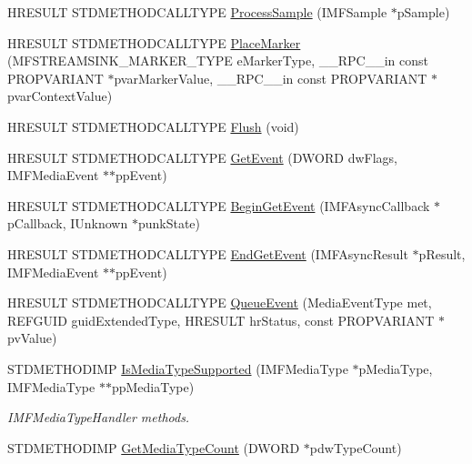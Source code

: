 \begin{DoxyCompactItemize}
\item 
H\+R\+E\+S\+U\+LT S\+T\+D\+M\+E\+T\+H\+O\+D\+C\+A\+L\+L\+T\+Y\+PE \hyperlink{class_stream_sink_a64ae241ae6b96fb3fd80edb6d02474ec}{Process\+Sample} (I\+M\+F\+Sample $\ast$p\+Sample)
\item 
H\+R\+E\+S\+U\+LT S\+T\+D\+M\+E\+T\+H\+O\+D\+C\+A\+L\+L\+T\+Y\+PE \hyperlink{class_stream_sink_ab8273c7f471918ba79d7033e132214ea}{Place\+Marker} (M\+F\+S\+T\+R\+E\+A\+M\+S\+I\+N\+K\+\_\+\+M\+A\+R\+K\+E\+R\+\_\+\+T\+Y\+PE e\+Marker\+Type, \+\_\+\+\_\+\+R\+P\+C\+\_\+\+\_\+in const P\+R\+O\+P\+V\+A\+R\+I\+A\+NT $\ast$pvar\+Marker\+Value, \+\_\+\+\_\+\+R\+P\+C\+\_\+\+\_\+in const P\+R\+O\+P\+V\+A\+R\+I\+A\+NT $\ast$pvar\+Context\+Value)
\item 
H\+R\+E\+S\+U\+LT S\+T\+D\+M\+E\+T\+H\+O\+D\+C\+A\+L\+L\+T\+Y\+PE \hyperlink{class_stream_sink_a92fca921c52cb7252f4c38c30e26c81a}{Flush} (void)
\item 
H\+R\+E\+S\+U\+LT S\+T\+D\+M\+E\+T\+H\+O\+D\+C\+A\+L\+L\+T\+Y\+PE \hyperlink{class_stream_sink_a5b5fed15133cf2cd9c9df8f9266fdd9a}{Get\+Event} (D\+W\+O\+RD dw\+Flags, I\+M\+F\+Media\+Event $\ast$$\ast$pp\+Event)
\item 
H\+R\+E\+S\+U\+LT S\+T\+D\+M\+E\+T\+H\+O\+D\+C\+A\+L\+L\+T\+Y\+PE \hyperlink{class_stream_sink_a1ed2f991ffbddfedb37c9aaa8e47092a}{Begin\+Get\+Event} (I\+M\+F\+Async\+Callback $\ast$p\+Callback, I\+Unknown $\ast$punk\+State)
\item 
H\+R\+E\+S\+U\+LT S\+T\+D\+M\+E\+T\+H\+O\+D\+C\+A\+L\+L\+T\+Y\+PE \hyperlink{class_stream_sink_af6389de29e4ae3b917a8c08d478d5c31}{End\+Get\+Event} (I\+M\+F\+Async\+Result $\ast$p\+Result, I\+M\+F\+Media\+Event $\ast$$\ast$pp\+Event)
\item 
H\+R\+E\+S\+U\+LT S\+T\+D\+M\+E\+T\+H\+O\+D\+C\+A\+L\+L\+T\+Y\+PE \hyperlink{class_stream_sink_ad557abea159d8b053902ef8d8501db3e}{Queue\+Event} (Media\+Event\+Type met, R\+E\+F\+G\+U\+ID guid\+Extended\+Type, H\+R\+E\+S\+U\+LT hr\+Status, const P\+R\+O\+P\+V\+A\+R\+I\+A\+NT $\ast$pv\+Value)
\item 
S\+T\+D\+M\+E\+T\+H\+O\+D\+I\+MP \hyperlink{class_stream_sink_a665aff8e79017f39a773042d18851b92}{Is\+Media\+Type\+Supported} (I\+M\+F\+Media\+Type $\ast$p\+Media\+Type, I\+M\+F\+Media\+Type $\ast$$\ast$pp\+Media\+Type)
\begin{DoxyCompactList}\small\item\em I\+M\+F\+Media\+Type\+Handler methods. \end{DoxyCompactList}\item 
S\+T\+D\+M\+E\+T\+H\+O\+D\+I\+MP \hyperlink{class_stream_sink_a46b2a0c9559652c3f403003d619bdf22}{Get\+Media\+Type\+Count} (D\+W\+O\+RD $\ast$pdw\+Type\+Count)
$$
\end{DoxyCompactItemize}
